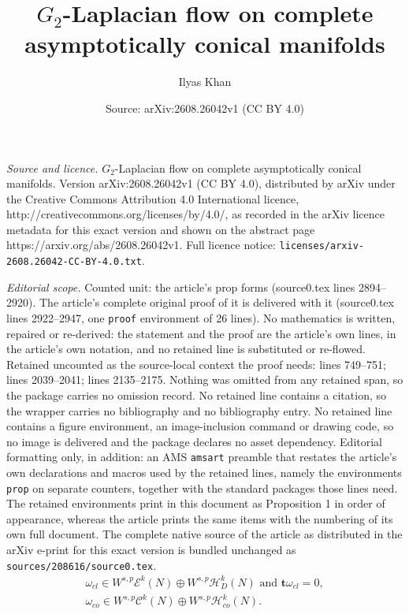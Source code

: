 \documentclass[10pt,a4paper]{amsart}
\title{$G_2$-Laplacian flow on complete asymptotically conical manifolds}
\author{Ilyas Khan}
\date{Source: arXiv:2608.26042v1 (CC BY 4.0)}
\newcommand{\bt}{\mathbf{t}}
\newcommand{\om}{\omega}
\newcommand{\sC}{{\mathscr C}}
\newcommand{\sE}{{\mathscr E}}
\newcommand{\sH}{{\mathscr H}}
\begin{document}
\maketitle

\noindent\emph{Source and licence.} $G_2$-Laplacian flow on complete asymptotically conical manifolds. Version arXiv:2608.26042v1 (CC BY 4.0), distributed by arXiv under the Creative Commons Attribution 4.0 International licence, http://creativecommons.org/licenses/by/4.0/, as recorded in the arXiv licence metadata for this exact version and shown on the abstract page https://arxiv.org/abs/2608.26042v1. Full licence notice: \texttt{licenses/arxiv-2608.26042-CC-BY-4.0.txt}.\par\smallskip

\noindent\textit{Editorial scope.} Counted unit: the article's prop forms (source0.tex lines 2894--2920). The article's complete original proof of it is delivered with it (source0.tex lines 2922--2947, one \texttt{proof} environment of 26 lines). No mathematics is written, repaired or re-derived: the statement and the proof are the article's own lines, in the article's own notation, and no retained line is substituted or re-flowed.  Retained uncounted as the source-local context the proof needs: lines 749--751; lines 2039--2041; lines 2135--2175.  Nothing was omitted from any retained span, so the package carries no omission record.  No retained line contains a citation, so the wrapper carries no bibliography and no bibliography entry.  No retained line contains a figure environment, an image-inclusion command or drawing code, so no image is delivered and the package declares no asset dependency.  Editorial formatting only, in addition: an AMS \texttt{amsart} preamble that restates the article's own declarations and macros used by the retained lines, namely the environments \texttt{prop} on separate counters, together with the standard packages those lines need.  The retained environments print in this document as Proposition 1 in order of appearance, whereas the article prints the same items with the numbering of its own full document.  The complete native source of the article as distributed in the arXiv e-print for this exact version is bundled unchanged as \texttt{sources/208616/source0.tex}.
\begin{multline}\label{equation helmholtz decomp}
\om_{cl} \in W^{s,p}\sE^k(N) \oplus W^{s,p}\sH_{D}^k(N) \text{ and }\bt \om_{cl} = 0,\\ \om_{co} \in W^{s,p}\sC^k(N) \oplus W^{s,p}\sH_{co}^k(N).
\end{multline}
\end{document}
